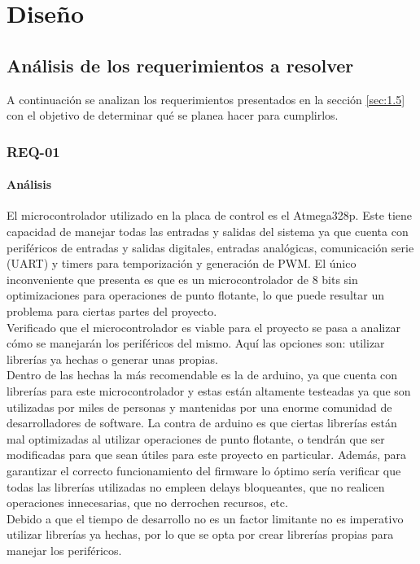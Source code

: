 \chapter{Diseño}
\thispagestyle{empty}
\section{Análisis de los requerimientos a resolver}
A continuación se analizan los requerimientos presentados en la sección \ref{sec:1.5} con el objetivo de determinar qué se planea hacer para cumplirlos.

\subsection{REQ-01}
\subsubsection{Análisis}
El microcontrolador utilizado en la placa de control es el Atmega328p. Este tiene capacidad de manejar todas las entradas y salidas del sistema ya que cuenta con periféricos de entradas y salidas digitales, entradas analógicas, comunicación serie (UART) y timers para temporización y generación de PWM. El único inconveniente que presenta es que es un microcontrolador de 8 bits sin optimizaciones para operaciones de punto flotante, lo que puede resultar un problema para ciertas partes del proyecto. \\
Verificado que el microcontrolador es viable para el proyecto se pasa a analizar cómo se manejarán los periféricos del mismo. Aquí las opciones son: utilizar librerías ya hechas o generar unas propias. \\
Dentro de las hechas la más recomendable es la de arduino, ya que cuenta con librerías para este microcontrolador y estas están altamente testeadas ya que son utilizadas por miles de personas y mantenidas por una enorme comunidad de desarrolladores de software. La contra de arduino es que ciertas librerías están mal optimizadas al utilizar operaciones de punto flotante, o tendrán que ser modificadas para que sean útiles para este proyecto en particular. Además, para garantizar el correcto funcionamiento del firmware lo óptimo sería verificar que todas las librerías utilizadas no empleen delays bloqueantes, que no realicen operaciones innecesarias, que no derrochen recursos, etc.\\
Debido a que el tiempo de desarrollo no es un factor limitante no es imperativo utilizar librerías ya hechas, por lo que se opta por crear librerías propias para manejar los periféricos.

